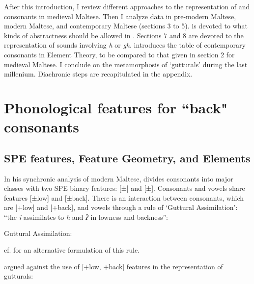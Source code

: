 \documentclass[output=paper]{langsci/langscibook}
\begin{document}
After this introduction, I review different approaches to the  representation of  and  consonants in medieval Maltese. Then I analyze data in pre-modern Maltese, modern Maltese, and contemporary Maltese (sections 3 to 5).  is devoted to what kinds of abstractness should be allowed in . Sections 7 and 8 are devoted to the representation of sounds involving  \textit{h} or \textit{għ}.  introduces the table of contemporary consonants in Element Theory, to be compared to that given in section 2 for medieval Maltese. I conclude on the metamorphosis of ‘gutturals’ during the last millenium. Diachronic steps are recapitulated in the appendix.


\section{Phonological features for ``back" consonants}
\subsection{SPE features, Feature Geometry, and Elements}

In his synchronic analysis of modern Maltese, \citet{Brame1972} divides consonants into major classes with two SPE binary features: [±] and [±]. Consonants and vowels share features [±low] and [±back]. There is an interaction between  consonants, which are [+low] and [+back], and vowels through a rule of ‘Guttural Assimilation’: “the  \textit{i} assimilates to \textit{ħ} and \textit{ʔ} in lowness and backness”:  

\ea
Guttural Assimilation: 
 \citep[33]{Brame1972}

cf. \citet[171]{Hume1994} for an alternative formulation of this rule.
\z

\citet[185]{Hayward1989} argued against the use of [+low, +back] features in the representation of gutturals:
\end{document}
